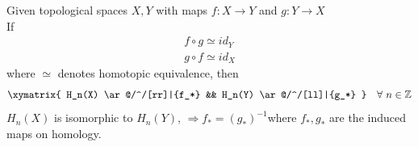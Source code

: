\documentclass[11pt,a4paper]{report}
\begin{document}
        \begin{thm} \label{homotopic}
         Given topological spaces $X, Y$ with maps $f: X \rightarrow Y$ and $g: Y \rightarrow X$ \\
         If
         \begin{align*}
         f \circ g \simeq id_Y \\
         g \circ f \simeq id_X
         \end{align*}
         where $\simeq$ denotes homotopic equivalence, then
        \[
                    \xymatrix{
                        H_n(X) \ar@/^/[rr]|{f_*}
                        && H_n(Y) \ar@/^/[ll]|{g_*} }
                       \quad  \forall \ n \in \ZZ
          \] $H_n(X)$ is isomorphic to $H_n(Y)$, $ \Rightarrow f_* = (g_*)^{-1} $where $f_*, g_*$ are the induced maps on homology.
        \end{thm}
\end{document}
